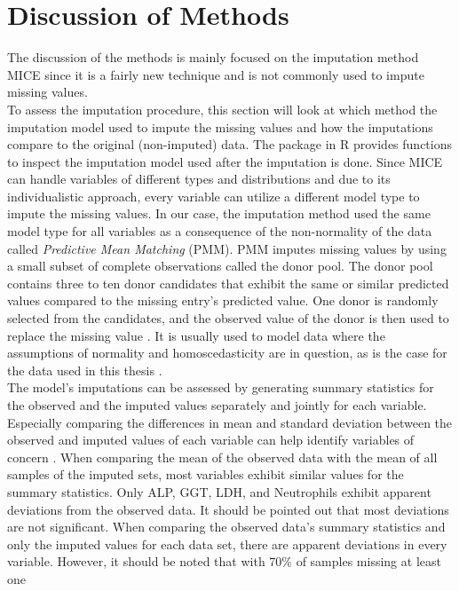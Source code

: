 \section{Discussion of Methods}
The discussion of the methods is mainly focused on the imputation method MICE 
since it is a fairly new technique and is not commonly used to impute missing 
values.
\\
To assess the imputation procedure, this section will look at which 
method the imputation model used to impute the missing values and how the 
imputations compare to the original (non-imputed) data. The  
package in R provides functions to inspect the imputation model used after the 
imputation is done. Since MICE can handle variables of different types and 
distributions and due to its individualistic approach, every variable can 
utilize a different model type to impute the missing values. In our case, the 
imputation method used the same model type for all variables as a consequence 
of the non-normality of the data called \textit{Predictive Mean Matching} (PMM).
PMM imputes missing values by using a small subset of complete observations 
called the donor pool. The donor pool contains three to ten donor candidates 
that exhibit the same or similar predicted values compared to the missing 
entry's predicted value. One donor is randomly selected from the candidates, 
and the observed value of the donor is then used to replace the missing value 
\cite{RN144, RN145, RN146}. It is usually used to model data where the 
assumptions of normality and homoscedasticity are in question, as is the case 
for the data used in this thesis \cite{RN146}.
\\
The model's imputations can be assessed by generating summary statistics 
for the observed and the imputed values separately and jointly for each 
variable.
Especially comparing the differences in mean and standard deviation 
between the observed and imputed values of each variable can help identify 
variables of concern \cite{RN141}. When comparing the mean of the observed data 
with the mean of all samples of the imputed sets, most variables exhibit 
similar values for the summary statistics. Only ALP, GGT, LDH, and Neutrophils 
exhibit apparent deviations from the observed data. It should be pointed out 
that most deviations are not significant.
When comparing the observed data's summary statistics and only the imputed 
values for each data set, there are apparent deviations in every variable. 
However, it should be noted that with 70\% of samples missing at least one 
